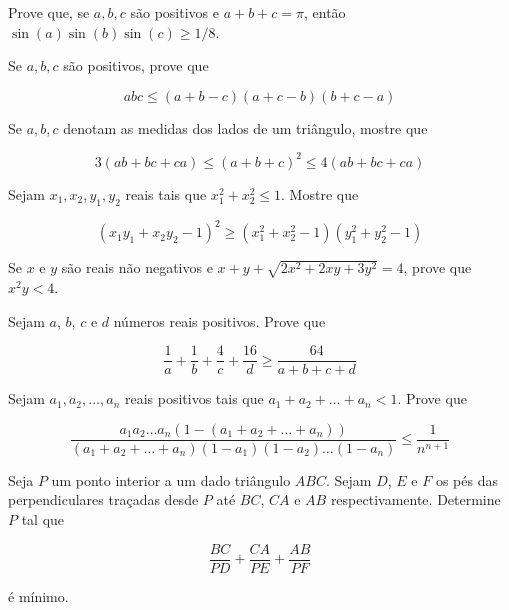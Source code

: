 \begin{questao}
  Prove que, se $a,b,c$ são positivos e $a+b+c=\pi$, então
  $\sin(a)\sin(b)\sin(c) \geq 1/8$.
\end{questao}

\begin{questao}
  Se $a,b,c$ são positivos, prove que

  $$ abc \leq (a+b-c)(a+c-b)(b+c-a) $$
\end{questao}

\begin{questao}
  Se $a,b,c$ denotam as medidas dos lados de um triângulo, mostre que

  $$ 3(ab+bc+ca) \leq (a+b+c)^2 \leq 4(ab+bc+ca) $$
\end{questao}

\begin{questao}
  Sejam $x_1,x_2,y_1,y_2$ reais tais que $x_1^2+x_2^2 \leq 1$. Mostre que

  $$ (x_1y_1+x_2y_2-1)^2 \geq (x_1^2+x_2^2-1)(y_1^2+y_2^2-1) $$
\end{questao}

\begin{questao}
  Se $x$ e $y$ são reais não negativos e $x+y+\sqrt{2x^2+2xy+3y^2} = 4$, prove
  que $x^2y < 4$.
\end{questao}

\begin{questao}
  Sejam $a$, $b$, $c$ e $d$ números reais positivos. Prove que

  $$ \frac{1}{a}+\frac{1}{b}+\frac{4}{c}+\frac{16}{d} \geq \frac{64}{a+b+c+d} $$
\end{questao}

\begin{questao}
  Sejam $a_1,a_2,\ldots,a_n$ reais positivos tais que $a_1+a_2+\ldots+a_n <
  1$. Prove que

  $$ \frac{a_1a_2\ldots a_n\left( 1-(a_1+a_2+\ldots +a_n) \right)}
  {(a_1+a_2+\ldots +a_n)(1-a_1)(1-a_2)\ldots(1-a_n)} \leq \frac{1}{n^{n+1}} $$
\end{questao}

\begin{questao}
  Seja $P$ um ponto interior a um dado triângulo $ABC$. Sejam $D$, $E$ e $F$ os
  pés das perpendiculares traçadas desde $P$ até $BC$, $CA$ e $AB$
  respectivamente. Determine $P$ tal que

  $$ \frac{BC}{PD} + \frac{CA}{PE} + \frac{AB}{PF} $$

  é mínimo.
\end{questao}

